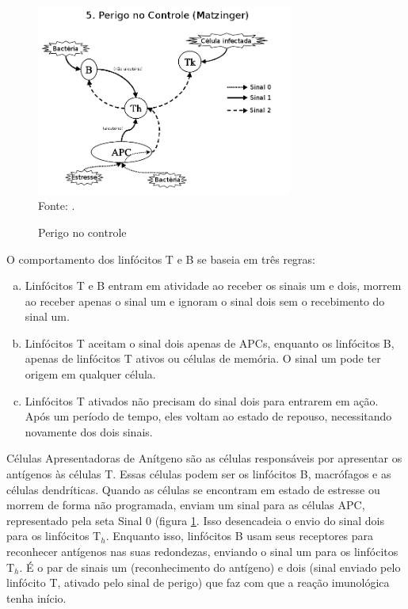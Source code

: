\begin{figure}[h!]
    \vspace{0.5cm}
    \centering
    \caption{Perigo no controle}
    \label{img:nis_danger}
    \vspace{0.5cm}
    \includegraphics[width=0.75\textwidth]{img/signals5-danger_br.png}
    \vspace{0.5cm}
    \\ Fonte: \citet{Aickelin2002}.
    \vspace{0.5cm}
\end{figure}

O comportamento dos linfócitos T e B se baseia em três regras:

\begin{enumerate}[a)]
\item Linfócitos T e B entram em atividade ao receber os sinais um e dois, morrem ao receber apenas o sinal um e ignoram o sinal dois sem o recebimento do sinal um.
\item Linfócitos T aceitam o sinal dois apenas de APCs, enquanto os linfócitos B, apenas de linfócitos T ativos ou células de memória. O sinal um pode ter origem em qualquer célula.
\item Linfócitos T ativados não precisam do sinal dois para entrarem em ação. Após um período de tempo, eles voltam ao estado de repouso, necessitando novamente dos dois sinais.
\end{enumerate}

Células Apresentadoras de Anítgeno são as células responsáveis por apresentar os antígenos às células T. Essas células podem ser os linfócitos B, macrófagos e as células dendríticas. Quando as células se encontram em estado de estresse ou morrem de forma não programada, enviam um sinal para as células APC, representado pela seta Sinal 0 (figura \ref{img:nis_danger}. Isso desencadeia o envio do sinal dois para os linfócitos T$_{h}$. Enquanto isso, linfócitos B usam seus receptores para reconhecer antígenos nas suas redondezas, enviando o sinal um para os linfócitos T$_{h}$. É o par de sinais um (reconhecimento do antígeno) e dois (sinal enviado pelo linfócito T, ativado pelo sinal de perigo) que faz com que a reação imunológica tenha início.

